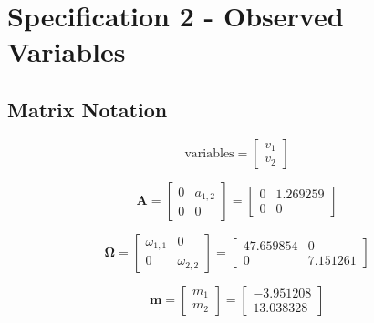 \documentclass[
]{book}
\begin{document}
\hypertarget{specification-2---observed-variables}{%
\section{Specification 2 - Observed Variables}\label{specification-2---observed-variables}}

\hypertarget{matrix-notation-1}{%
\subsection{Matrix Notation}\label{matrix-notation-1}}

\begin{equation}
  \mathrm{variables}
  =
  \begin{bmatrix}
    v_1 \\
    v_2
  \end{bmatrix}
\end{equation}

\begin{equation}
  \mathbf{A}
  =
  \begin{bmatrix}
    0 & a_{1, 2} \\
    0 & 0
  \end{bmatrix}
  =
  \begin{bmatrix}
    0 & 1.269259 \\
    0 & 0
  \end{bmatrix}
\end{equation}

\begin{equation}
  \boldsymbol{\Omega}
  =
  \begin{bmatrix}
    \omega_{1, 1} & 0             \\
    0             & \omega_{2, 2}
  \end{bmatrix}
  =
  \begin{bmatrix}
    47.659854 & 0 \\
    0 & 7.151261
  \end{bmatrix}
\end{equation}

\begin{equation}
  \mathbf{m}
  =
  \begin{bmatrix}
    m_1 \\
    m_2
  \end{bmatrix}
  =
  \begin{bmatrix}
    -3.951208 \\
    13.038328
  \end{bmatrix}
\end{equation}
\end{document}
